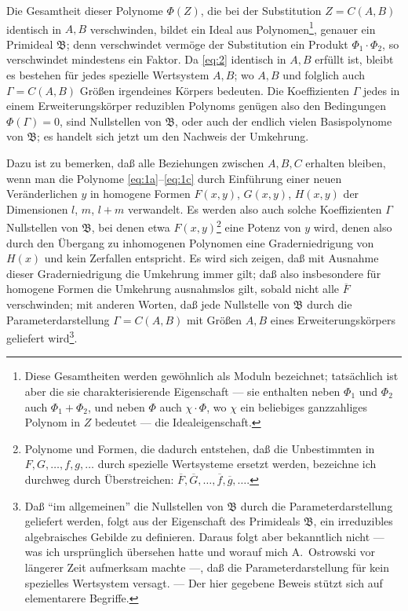 \documentclass[fontsize=10pt,paper=a5,pagesize,headings=small]{scrbook}
\newcommand{\ideal}[1]{\mathfrak{#1}}
\theoremstyle{plain}
\begin{document}
Die Gesamtheit dieser Polynome $\varPhi(Z)$, die bei der Substitution $Z = C(A,B)$
identisch in $A,B$ verschwinden, bildet ein Ideal aus Polynomen\footnote{Diese
Gesamtheiten werden gewöhnlich als Moduln bezeichnet; tatsächlich ist aber die sie
charakterisierende Eigenschaft --- sie enthalten neben $\varPhi_1$ und $\varPhi_2$ auch
$\varPhi_1 + \varPhi_2$, und neben $\varPhi$ auch $\chi \cdot \varPhi$, wo $\chi$ ein beliebiges ganzzahliges
Polynom in $Z$ bedeutet --- die Idealeigenschaft.}, genauer ein Primideal
$\ideal{B}$; denn verschwindet vermöge der Substitution ein Produkt
$\varPhi_1 \cdot \varPhi_2$, so verschwindet mindestens ein Faktor. Da \eqref{eq:2} identisch in
$A,B$ erfüllt ist, bleibt es bestehen für jedes spezielle Wertsystem $A,B$; wo
$A,B$ und folglich auch $\varGamma = C(A,B)$ Größen irgendeines Körpers bedeuten.
Die Koeffizienten $\varGamma$ jedes in einem Erweiterungskörper reduziblen Polynoms
genügen also den Bedingungen $\varPhi(\varGamma) = 0$, sind Nullstellen von $\ideal{B}$,
oder auch der endlich vielen Basispolynome von $\ideal{B}$; es handelt sich jetzt um
den Nachweis der Umkehrung.

Dazu ist zu bemerken, daß alle Beziehungen zwischen $A,B,C$ erhalten bleiben,
wenn man die Polynome \eqref{eq:1a}--\eqref{eq:1c} durch Einführung einer neuen
Veränderlichen $y$ in homogene Formen $F(x,y)$, $G(x,y)$, $H(x,y)$ der Dimensionen
$l$, $m$, $l+m$ verwandelt. Es werden also auch solche Koeffizienten $\varGamma$
Nullstellen von $\ideal{B}$, bei denen etwa $F(x,y)$\footnote{Polynome und Formen, die
dadurch entstehen, daß die Unbestimmten in $F,G,\dots,f,g,\dots$ durch spezielle
Wertsysteme ersetzt werden, bezeichne ich durchweg durch Überstreichen:
$\overline{F},\overline{G},\dots,\overline{f},\overline{g},\dots$.} eine Potenz von $y$ wird, denen also
durch den Übergang zu inhomogenen Polynomen eine Graderniedrigung von $H(x)$
und kein Zerfallen entspricht. Es wird sich zeigen, daß mit Ausnahme dieser
Graderniedrigung die Umkehrung immer gilt; daß also insbesondere für homogene
Formen die Umkehrung ausnahmslos gilt, sobald nicht alle $\overline{F}$ verschwinden;
mit anderen Worten, daß jede Nullstelle von $\ideal{B}$ durch die Parameterdarstellung
$\varGamma = C(A,B)$ mit Größen $A,B$ eines Erweiterungskörpers geliefert
wird\footnote{Daß ``im allgemeinen'' die Nullstellen von $\ideal{B}$ durch die
Parameterdarstellung geliefert werden, folgt aus der Eigenschaft des Primideals
$\ideal{B}$, ein irreduzibles algebraisches Gebilde zu definieren. Daraus folgt aber
bekanntlich nicht --- was ich ursprünglich übersehen hatte und worauf mich
A.~Ostrowski vor längerer Zeit aufmerksam machte ---, daß die Parameterdarstellung
für kein spezielles Wertsystem versagt. --- Der hier gegebene Beweis stützt sich
auf elementarere Begriffe.}.
\end{document}

